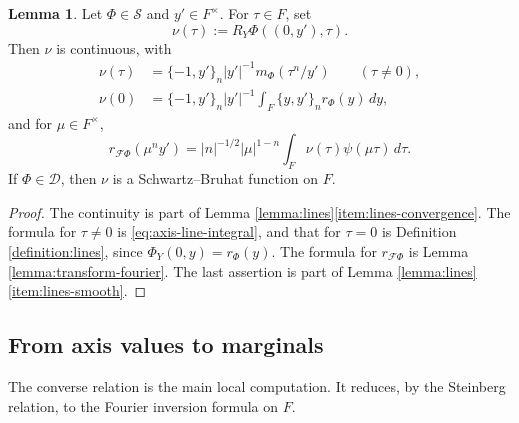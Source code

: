 \documentclass[reqno]{amsart}
\theoremstyle{plain}
\theoremstyle{definition}
\theoremstyle{itplain}
\newtheorem{lemma}[theorem]{Lemma}
\numberwithin{equation}{section}
\numberwithin{theorem}{section}
\begin{document}
\begin{lemma}\label{lemma:marginal-axis}
  Let $\Phi \in \mathcal{S}$ and $y' \in F^\times$.  For $\tau \in F$, set
  \begin{equation*}
    \nu(\tau) := R_Y \Phi((0, y'), \tau).
  \end{equation*}
  Then $\nu$ is continuous, with
  \begin{align*}
    \nu(\tau) &= \{-1, y'\}_n \lvert y' \rvert^{-1} m_\Phi(\tau^n / y')
    \qquad (\tau \neq 0), \\
    \nu(0) &= \{-1, y'\}_n \lvert y' \rvert^{-1} \int_F \{y, y'\}_n r_\Phi(y) \, d y,
  \end{align*}
  and for $\mu \in F^\times$,
  \begin{equation*}
    r_{\mathcal{F} \Phi}(\mu^n y') = \lvert n \rvert^{-1/2} \lvert \mu \rvert^{1 - n} \int_F \nu(\tau) \psi(\mu \tau) \, d \tau.
  \end{equation*}
  If $\Phi \in \mathcal{D}$, then $\nu$ is a Schwartz--Bruhat function on $F$.
\end{lemma}
\begin{proof}
  The continuity is part of Lemma \ref{lemma:lines}\eqref{item:lines-convergence}.  The formula for $\tau \neq 0$ is \eqref{eq:axis-line-integral}, and that for $\tau = 0$ is Definition \ref{definition:lines}, since $\Phi_Y(0, y) = r_\Phi(y)$.  The formula for $r_{\mathcal{F} \Phi}$ is Lemma \ref{lemma:transform-fourier}.  The last assertion is part of Lemma \ref{lemma:lines}\eqref{item:lines-smooth}.
\end{proof}

\subsection{From axis values to marginals}\label{sec:from-axis-values-to-marginals}
The converse relation is the main local computation.  It reduces, by the Steinberg relation, to the Fourier inversion formula on $F$.
\end{document}
